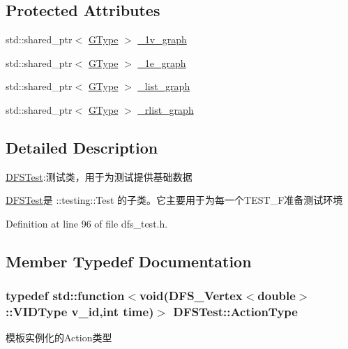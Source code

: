 \subsection*{Protected Attributes}
\begin{DoxyCompactItemize}
\item 
std\+::shared\+\_\+ptr$<$ \hyperlink{class_d_f_s_test_a32b63a9c79f6f7e7021daacf076a1512}{G\+Type} $>$ \hyperlink{class_d_f_s_test_a4dbae7784992bee522457b53da2141c2}{\+\_\+1v\+\_\+graph}
\item 
std\+::shared\+\_\+ptr$<$ \hyperlink{class_d_f_s_test_a32b63a9c79f6f7e7021daacf076a1512}{G\+Type} $>$ \hyperlink{class_d_f_s_test_ae5351e523345888ffc64aa892d93d3c2}{\+\_\+1e\+\_\+graph}
\item 
std\+::shared\+\_\+ptr$<$ \hyperlink{class_d_f_s_test_a32b63a9c79f6f7e7021daacf076a1512}{G\+Type} $>$ \hyperlink{class_d_f_s_test_a9607eac5350c4cdd449c353fed482efc}{\+\_\+list\+\_\+graph}
\item 
std\+::shared\+\_\+ptr$<$ \hyperlink{class_d_f_s_test_a32b63a9c79f6f7e7021daacf076a1512}{G\+Type} $>$ \hyperlink{class_d_f_s_test_a93a79d0654eb82517990c8f5419148a8}{\+\_\+rlist\+\_\+graph}
\end{DoxyCompactItemize}


\subsection{Detailed Description}
\hyperlink{class_d_f_s_test}{D\+F\+S\+Test}\+:测试类，用于为测试提供基础数据 

{\ttfamily \hyperlink{class_d_f_s_test}{D\+F\+S\+Test}}是 {\ttfamily \+::testing\+::\+Test} 的子类。它主要用于为每一个{\ttfamily T\+E\+S\+T\+\_\+\+F}准备测试环境 

Definition at line 96 of file dfs\+\_\+test.\+h.



\subsection{Member Typedef Documentation}
\hypertarget{class_d_f_s_test_ac4c131b9b4f9de55192b1c634dc1c37f}{}
\subsubsection[{Action\+Type}]{\setlength{\rightskip}{0pt plus 5cm}typedef std\+::function$<$void({\bf D\+F\+S\+\_\+\+Vertex}$<$double$>$\+::V\+I\+D\+Type v\+\_\+id,int time)$>$ {\bf D\+F\+S\+Test\+::\+Action\+Type}}\label{class_d_f_s_test_ac4c131b9b4f9de55192b1c634dc1c37f}
模板实例化的\+Action类型 

